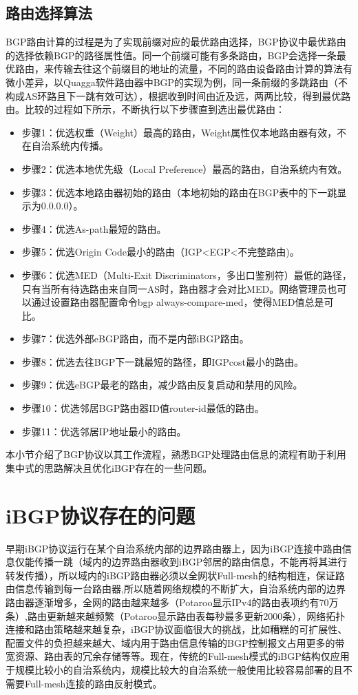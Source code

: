 \subsection{路由选择算法}
\label{subsec:calculation}
BGP路由计算\cite{DianeTeare2016CCNP}的过程是为了实现前缀对应的最优路由选择，BGP协议中最优路由的选择依赖BGP的路径属性值。同一个前缀可能有多条路由，BGP会选择一条最优路由，来传输去往这个前缀目的地址的流量，不同的路由设备路由计算的算法有微小差异，以Quagga软件路由器中BGP的实现为例，同一条前缀的多跳路由（不构成AS环路且下一跳有效可达），根据收到时间由近及远，两两比较，得到最优路由。比较的过程如下所示，不断执行以下步骤直到选出最优路由：

\begin{itemize}
    \item 步骤1：优选权重（Weight）最高的路由，Weight属性仅本地路由器有效，不在自治系统内传播。
    \item 步骤2：优选本地优先级（Local Preference）最高的路由，自治系统内有效。
    \item 步骤3：优选本地路由器初始的路由（本地初始的路由在BGP表中的下一跳显示为0.0.0.0）。
    \item 步骤4：优选As-path最短的路由。
    \item 步骤5：优选Origin Code最小的路由（IGP<EGP<不完整路由)。
    \item 步骤6：优选MED（Multi-Exit Discriminators，多出口鉴别符）最低的路径，只有当所有待选路由来自同一AS时，路由器才会对比MED。网络管理员也可以通过设置路由器配置命令bgp always-compare-med，使得MED值总是可比。
    \item 步骤7：优选外部eBGP路由，而不是内部iBGP路由。
    \item 步骤8：优选去往BGP下一跳最短的路径，即IGPcost最小的路由。
    \item 步骤9：优选eBGP最老的路由，减少路由反复启动和禁用的风险。
    \item 步骤10：优选邻居BGP路由器ID值router-id最低的路由。
    \item 步骤11：优选邻居IP地址最小的路由。
\end{itemize}

本小节介绍了BGP协议以其工作流程，熟悉BGP处理路由信息的流程有助于利用集中式的思路解决且优化iBGP存在的一些问题。

\section{iBGP协议存在的问题}

早期iBGP协议运行在某个自治系统内部的边界路由器上，因为iBGP连接中路由信息仅能传播一跳（域内的边界路由器收到iBGP邻居的路由信息，不能再将其进行转发传播），所以域内的iBGP路由器必须以全网状Full-mesh的结构相连，保证路由信息传输到每一台路由器,所以随着网络规模的不断扩大，自治系统内部的边界路由器逐渐增多，全网的路由越来越多（Potaroo\cite{bgptabledata}显示IPv4的路由表项约有70万条）,路由更新越来越频繁（Potaroo显示路由表每秒最多更新2000条），网络拓扑连接和路由策略越来越复杂，iBGP协议面临很大的挑战\cite{ibgp2016infocom}，比如糟糕的可扩展性、配置文件的负担越来越大、域内用于路由信息传输的BGP控制报文占用更多的带宽资源、路由表的冗余存储等等。现在，传统的Full-mesh模式的iBGP结构仅应用于规模比较小的自治系统内，规模比较大的自治系统一般使用比较容易部署的且不需要Full-mesh连接的路由反射\cite{rfc2796}模式。

